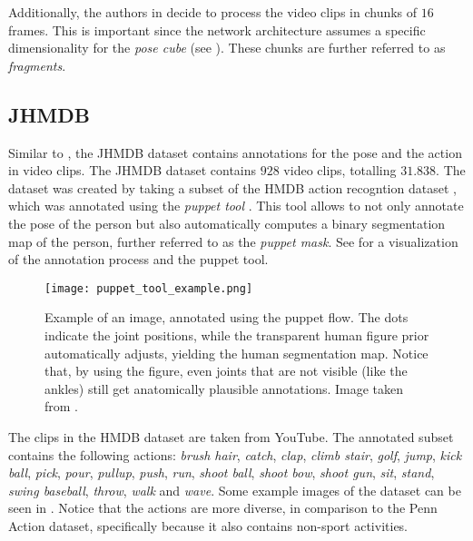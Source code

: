 Additionally, the authors in \cite{luvizon_2d/3d_2018} decide to process the video clips in chunks of $16$ frames.
This is important since the network architecture assumes a specific dimensionality for the \textit{pose cube} (see ).
These chunks are further referred to as \textit{fragments}. 

\subsection{JHMDB}
\label{sec:exp-jhmdb}

Similar to \cite{zhang_actemes_2013} , the JHMDB dataset \cite{jhuang_towards_2013} contains annotations for the pose and the action in video clips.
The JHMDB dataset contains $928$ video clips, totalling $31.838$. 
The dataset was created by taking a subset of the HMDB action recogntion dataset \cite{kuehne_hmdb:_2011}, which was annotated using the \textit{puppet tool} \cite{zuffi_pictorial_2012}.
This tool allows to not only annotate the pose of the person but also automatically computes a binary segmentation map of the person, further referred to as the \textit{puppet mask}.
See  for a visualization of the annotation process and the puppet tool.

\begin{figure}[htb!]
    \centering
    \texttt{[image: puppet\_tool\_example.png]}
    \caption{Example of an image, annotated using the puppet flow. The dots indicate the joint positions, while the transparent human figure prior automatically adjusts, yielding the human segmentation map. Notice that, by using the figure, even joints that are not visible (like the ankles) still get anatomically plausible annotations. Image taken from \cite{max_planck_institute_for_intelligent_systems_jhmdb_nodate}.}
    \label{fig:puppet_tool_example}
\end{figure}

The clips in the HMDB dataset are taken from YouTube.
The annotated subset contains the following actions:
\textit{brush hair}, \textit{catch}, \textit{clap}, \textit{climb stair}, \textit{golf}, \textit{jump}, \textit{kick ball}, \textit{pick}, \textit{pour}, \textit{pullup}, \textit{push}, \textit{run}, \textit{shoot ball}, \textit{shoot bow}, \textit{shoot gun}, \textit{sit}, \textit{stand}, \textit{swing baseball}, \textit{throw}, \textit{walk} and \textit{wave}.
Some example images of the dataset can be seen in .
Notice that the actions are more diverse, in comparison to the Penn Action dataset, specifically because it also contains non-sport activities.

